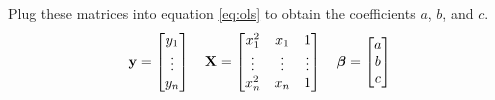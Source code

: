 Plug these matrices into equation \eqref{eq:ols} to obtain the coefficients $a$,
$b$, and $c$.
\begin{equation*}
  \mathbf{y} = \begin{bmatrix}
    y_1 \\
    \vdots \\
    y_n
  \end{bmatrix}
  \quad
  \mathbf{X} = \begin{bmatrix}
    x_1^2 & x_1 & 1 \\
    \vdots & \vdots & \vdots \\
    x_n^2 & x_n & 1
  \end{bmatrix}
  \quad
  \bm{\beta} = \begin{bmatrix}
    a \\
    b \\
    c
  \end{bmatrix}
\end{equation*}

